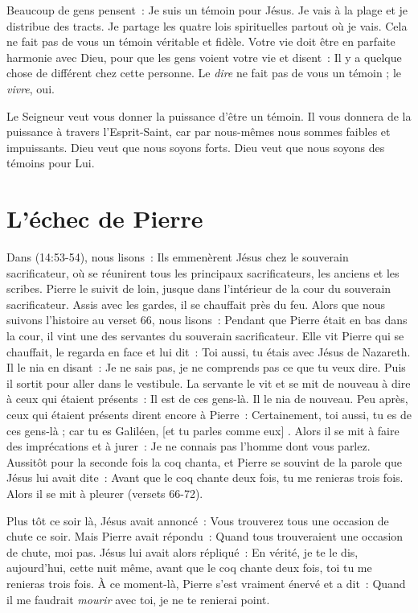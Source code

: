 Beaucoup de gens pensent~:
 \og Je suis un témoin pour Jésus. Je vais à la plage
 et je distribue des tracts. Je partage les quatre lois spirituelles
 partout où je vais. \fg{}
 Cela ne fait pas de vous un témoin véritable et fidèle.
 Votre vie doit être en parfaite harmonie avec Dieu,
 pour que les gens voient votre vie et disent~:
 \og Il y a quelque chose de différent chez cette personne. \fg{}
 Le \emph{dire} ne fait pas de vous un témoin ; le \emph{vivre}, oui.

Le Seigneur veut vous donner la puissance d'être un témoin.
 Il vous donnera de la puissance à travers l'Esprit-Saint,
 car par nous-mêmes nous sommes faibles et impuissants.
 Dieu veut que nous soyons forts.
 Dieu veut que nous soyons des témoins pour Lui.

\section*{L'échec de Pierre}

Dans (14:53-54), nous lisons~:
 \og Ils emmenèrent Jésus chez le souverain sacrificateur,
 où se réunirent tous les principaux sacrificateurs,
 les anciens et les scribes.
 Pierre le suivit de loin, jusque dans l'intérieur de la cour
 du souverain sacrificateur.
 Assis avec les gardes, il se chauffait près du feu. \fg{}
 Alors que nous suivons l'histoire au verset 66, nous lisons~:
 \og Pendant que Pierre était en bas dans la cour,
 il vint une des servantes du souverain sacrificateur.
 Elle vit Pierre qui se chauffait, le regarda en face et lui dit~:
 Toi aussi, tu étais avec Jésus de Nazareth. Il le nia en disant~:
 Je ne sais pas, je ne comprends pas ce que tu veux dire.
 Puis il sortit pour aller dans le vestibule.
 La servante le vit et se mit de nouveau à dire
 à ceux qui étaient présents~: Il est de ces gens-là.
 Il le nia de nouveau. Peu après, ceux qui étaient présents
 dirent encore à Pierre~: Certainement, toi aussi,
 tu es de ces gens-là ; car tu es Galiléen, [et tu parles comme eux] .
 Alors il se mit à faire des imprécations et à jurer~:
 Je ne connais pas l'homme dont vous parlez. Aussitôt pour la seconde fois
 la coq chanta, et Pierre se souvint de la parole que Jésus lui avait dite~:
 Avant que le coq chante deux fois, tu me renieras trois fois.
 Alors il se mit à pleurer \fg{} (versets 66-72).

Plus tôt ce soir là, Jésus avait annoncé~:
 \og Vous trouverez tous une occasion de chute ce soir. \fg{}
 Mais Pierre avait répondu~:
 \og Quand tous trouveraient une occasion de chute, moi pas. \fg{}
 Jésus lui avait alors répliqué~:
 \og En vérité, je te le dis, aujourd'hui, cette nuit même,
 avant que le coq chante deux fois, toi tu me renieras trois fois. \fg{}
 À ce moment-là, Pierre s'est vraiment énervé et a dit~:
 \og Quand il me faudrait \emph{mourir} avec toi, je ne te renierai point. \fg{}


